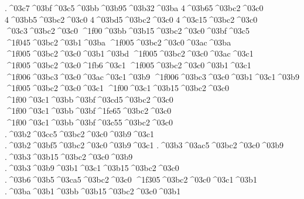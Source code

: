 {.^^^^03c7^^^^03bf^^^^03c5^^^^03bb^^^^03b95^^^^03b32^^^^03ba
4^^^^03b65^^^^03bc2^^^^03c0
4^^^^03bb5^^^^03bc2^^^^03c0
4^^^^03bd5^^^^03bc2^^^^03c0
4^^^^03c15^^^^03bc2^^^^03c0
^^^^03c3^^^^03bc2^^^^03c0
^^^^1f00^^^^03bb^^^^03b15^^^^03bc2^^^^03c0^^^^03bf^^^^03c5   %
^^^^1f045^^^^03bc2^^^^03b1^^^^03ba     %
^^^^1f005^^^^03bc2^^^^03c0^^^^03ac^^^^03ba
^^^^1f005^^^^03bc2^^^^03c0^^^^03b1^^^^03bd     %
^^^^1f005^^^^03bc2^^^^03c0^^^^03ac^^^^03c1    %
^^^^1f005^^^^03bc2^^^^03c0^^^^1fb6^^^^03c1
^^^^1f005^^^^03bc2^^^^03c0^^^^03b1^^^^03c1
  ^^^^1f006^^^^03bc3^^^^03c0^^^^03ac^^^^03c1^^^^03b9   %
  ^^^^1f006^^^^03bc3^^^^03c0^^^^03b1^^^^03c1^^^^03b9
^^^^1f005^^^^03bc2^^^^03c0^^^^03c1      %
^^^^1f00^^^^03c1^^^^03b15^^^^03bc2^^^^03c0     %
^^^^1f00^^^^03c1^^^^03bb^^^^03bf^^^^03cd5^^^^03bc2^^^^03c0  %
^^^^1f00^^^^03c1^^^^03bb^^^^03bf^^^^1fe65^^^^03bc2^^^^03c0
^^^^1f00^^^^03c1^^^^03bb^^^^03bf^^^^03c55^^^^03bc2^^^^03c0
.^^^^03b2^^^^03cc5^^^^03bc2^^^^03c0^^^^03b9^^^^03c1   %
.^^^^03b2^^^^03bf5^^^^03bc2^^^^03c0^^^^03b9^^^^03c1    %
.^^^^03b3^^^^03ac5^^^^03bc2^^^^03c0^^^^03b9    %
.^^^^03b3^^^^03b15^^^^03bc2^^^^03c0^^^^03b9
.^^^^03b3^^^^03b9^^^^03b1^^^^03c1^^^^03b15^^^^03bc2^^^^03c0 		%
.^^^^03b6^^^^03b5^^^^03ca5^^^^03bc2^^^^03c0    %
^^^^1f305^^^^03bc2^^^^03c0^^^^03c1^^^^03b1     %
.^^^^03ba^^^^03b1^^^^03bb^^^^03b15^^^^03bc2^^^^03c0^^^^03b1   %
}
